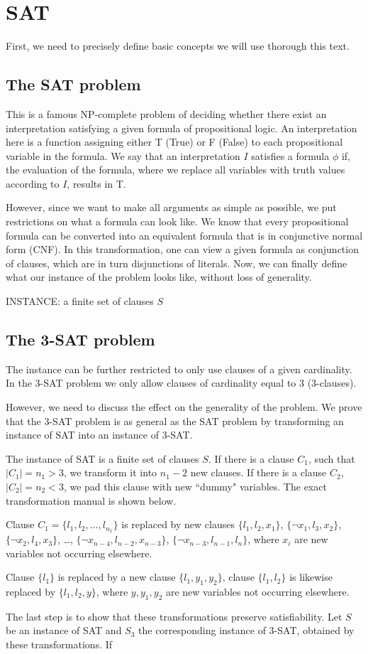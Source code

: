 \chapter{SAT}

First, we need to precisely define basic concepts we will use thorough this text.

\section{The SAT problem}
This is a famous NP-complete problem of deciding whether there exist an interpretation satisfying a given formula of propositional logic. An interpretation here is a function assigning either T (True) or F (False) to each propositional variable in the formula. We say that an interpretation $I$ satisfies a formula $\phi$ if, the evaluation of the formula, where we replace all variables with truth values according to $I$, results in T.

However, since we want to make all arguments as simple as possible, we put restrictions on what a formula can look like. We know that every propositional formula can be converted into an equivalent formula that is in conjunctive normal form (CNF). In this transformation, one can view a given formula as conjunction of clauses, which are in turn disjunctions of literals. Now, we can finally define what our instance of the problem looks like, without loss of generality.

INSTANCE: a finite set of clauses $S$

\section{The 3-SAT problem}
The instance can be further restricted to only use clauses of a given cardinality. In the 3-SAT problem we only allow clauses of cardinality equal to 3 (3-clauses).

However, we need to discuss the effect on the generality of the problem. We prove that the 3-SAT problem is as general as the SAT problem by transforming an instance of SAT into an instance of 3-SAT.

The instance of SAT is a finite set of clauses $S$. If there is a clause $C_1$, such that $|C_1| = n_1 > 3$, we transform it into $n_1-2$ new clauses. If there is a clause $C_2$, $|C_2| = n_2 < 3$, we pad this clause with new ``dummy" variables. The exact transformation manual is shown below.

Clause $C_1 = \{l_1, l_2, \ldots, l_{n_1}\}$ is replaced by new clauses $\{l_1, l_2, x_1\}$, $\{\neg x_1, l_3, x_2\}$, $\{\neg x_2, l_4, x_3\}$, \ldots, $\{\neg x_{n-4},l_{n-2},x_{n-3}\}$, $\{\neg x_{n-3}, l_{n-1}, l_n\}$, where $x_i$ are new variables not occurring elsewhere.

Clause $\{l_1\}$ is replaced by a new clause $\{l_1, y_1, y_2\}$, clause $\{l_1, l_2\}$ is likewise replaced by $\{l_1, l_2, y\}$, where $y, y_1, y_2$ are new variables not occurring elsewhere.

The last step is to show that these transformations preserve satisfiability. Let $S$ be an instance of SAT and $S_3$ the corresponding instance of 3-SAT, obtained by these transformations. If 
